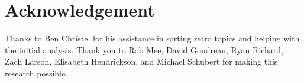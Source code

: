 

\section*{Acknowledgement}
Thanks to Ben Christel for his assistance in sorting retro topics and helping with the initial analysis. Thank you to Rob Mee, David Goudreau, Ryan Richard, Zach Larson, Elisabeth Hendrickson, and Michael Schubert for making this research possible.



